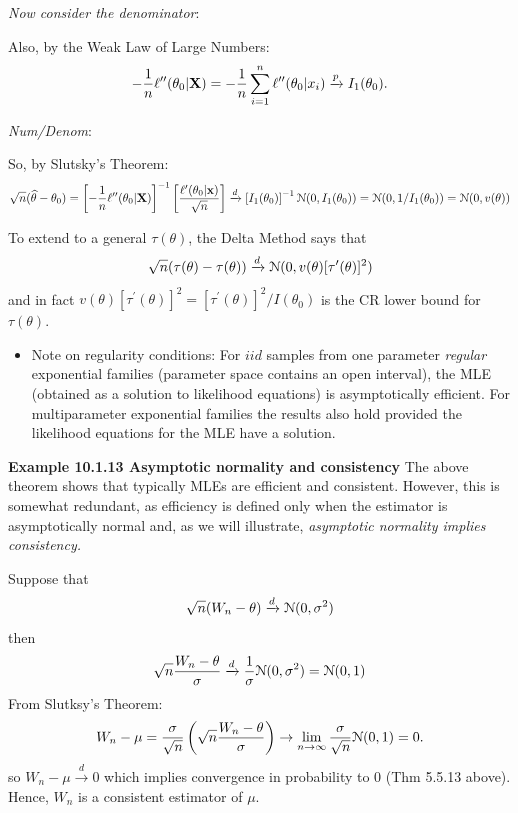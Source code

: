 \documentclass[11pt,]{article}
\def\bx{{\bf x}}
\def\bX{{\bf X}}
\def\thetahat{{\widehat\theta}}
\def\Nsc{{\cal N}}
\def\sumin{\sum_{i=1}^n}
\begin{document}
\emph{Now consider the denominator}:

Also, by the Weak Law of Large Numbers:
\[-\frac{1}{n} \ell^{\prime\prime}(\theta_0 |\bX) = -\frac{1}{n}\sumin \ell^{\prime\prime}(\theta_0 |x_i) \xrightarrow{p} I_1(\theta_0).\]

\emph{Num/Denom}:

So, by Slutsky's Theorem:
\[\sqrt{n} (\thetahat - \theta_0) =\left[-\frac{1}{n} \ell^{\prime\prime}(\theta_0 |\bX) \right]^{-1} \left[\frac{\ell^\prime(\theta_0 | \bx)}{\sqrt{n}} \right] \xrightarrow{d}
 \left[I_1(\theta_0)\right]^{-1} \Nsc(0,I_1(\theta_0)) =  \Nsc(0,1/I_1(\theta_0)) = \Nsc(0,v(\theta))\]

To extend to a general \(\tau(\theta)\), the Delta Method says that\\
\[\sqrt{n}(\tau(\theta) - \tau(\theta)) \xrightarrow{d} \Nsc(0, v(\theta)[\tau^\prime(\theta)]^2)\]
and in fact
\(v(\theta)[\tau^\prime(\theta)]^2 = [\tau^\prime(\theta)]^2/I(\theta_0)\)
is the CR lower bound for \(\tau(\theta)\).

\begin{itemize}
 \item Note on regularity conditions: For $iid$ samples from one parameter {\em regular} exponential families (parameter space contains an open interval), the MLE (obtained as a solution to likelihood equations) is asymptotically efficient. For multiparameter exponential families the results also hold provided the likelihood equations for the MLE have a solution.
 \end{itemize}

\noindent\textbf{Example 10.1.13 Asymptotic normality and consistency}
The above theorem shows that typically MLEs are efficient and
consistent. However, this is somewhat redundant, as efficiency is
defined only when the estimator is asymptotically normal and, as we will
illustrate, \emph{asymptotic normality implies consistency.}

Suppose that \[\sqrt{n}(W_n - \theta) \xrightarrow{d} \Nsc(0,\sigma^2)\]
then
\[\sqrt{n}\frac{W_n - \theta}{\sigma} \xrightarrow{d} \frac{1}{\sigma}\Nsc(0,\sigma^2) = \Nsc(0,1)\]
From Slutksy's Theorem:
\[W_n - \mu = \frac{\sigma}{\sqrt{n}} \left( \sqrt{n}\frac{W_n - \theta}{\sigma} \right) \to \lim_{n\to\infty}  \frac{\sigma}{\sqrt{n}}\Nsc(0,1) = 0.\]
so \(W_n - \mu \xrightarrow{d} 0\) which implies convergence in
probability to 0 (Thm 5.5.13 above). Hence, \(W_n\) is a consistent
estimator of \(\mu\).
\end{document}
